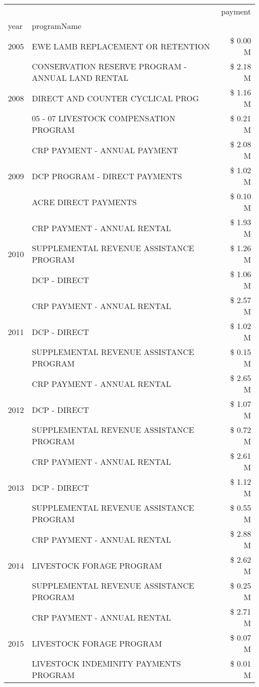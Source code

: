 \begin{tabular}{llr}
\toprule
 &  & payment \\
year & programName &  \\
\midrule
2005 & EWE LAMB REPLACEMENT OR RETENTION & \$ 0.00 M \\
\cline{1-3}
\multirow[t]{3}{*}{2008} & CONSERVATION RESERVE PROGRAM - ANNUAL LAND RENTAL & \$ 2.18 M \\
 & DIRECT AND COUNTER CYCLICAL PROG & \$ 1.16 M \\
 & 05 - 07 LIVESTOCK COMPENSATION PROGRAM & \$ 0.21 M \\
\cline{1-3}
\multirow[t]{3}{*}{2009} & CRP PAYMENT - ANNUAL PAYMENT & \$ 2.08 M \\
 & DCP PROGRAM - DIRECT PAYMENTS & \$ 1.02 M \\
 & ACRE DIRECT PAYMENTS & \$ 0.10 M \\
\cline{1-3}
\multirow[t]{3}{*}{2010} & CRP PAYMENT - ANNUAL RENTAL & \$ 1.93 M \\
 & SUPPLEMENTAL REVENUE ASSISTANCE PROGRAM & \$ 1.26 M \\
 & DCP - DIRECT & \$ 1.06 M \\
\cline{1-3}
\multirow[t]{3}{*}{2011} & CRP PAYMENT - ANNUAL RENTAL & \$ 2.57 M \\
 & DCP - DIRECT & \$ 1.02 M \\
 & SUPPLEMENTAL REVENUE ASSISTANCE PROGRAM & \$ 0.15 M \\
\cline{1-3}
\multirow[t]{3}{*}{2012} & CRP PAYMENT - ANNUAL RENTAL & \$ 2.65 M \\
 & DCP - DIRECT & \$ 1.07 M \\
 & SUPPLEMENTAL REVENUE ASSISTANCE PROGRAM & \$ 0.72 M \\
\cline{1-3}
\multirow[t]{3}{*}{2013} & CRP PAYMENT - ANNUAL RENTAL & \$ 2.61 M \\
 & DCP - DIRECT & \$ 1.12 M \\
 & SUPPLEMENTAL REVENUE ASSISTANCE PROGRAM & \$ 0.55 M \\
\cline{1-3}
\multirow[t]{3}{*}{2014} & CRP PAYMENT - ANNUAL RENTAL & \$ 2.88 M \\
 & LIVESTOCK FORAGE PROGRAM & \$ 2.62 M \\
 & SUPPLEMENTAL REVENUE ASSISTANCE PROGRAM & \$ 0.25 M \\
\cline{1-3}
\multirow[t]{3}{*}{2015} & CRP PAYMENT - ANNUAL RENTAL & \$ 2.71 M \\
 & LIVESTOCK FORAGE PROGRAM & \$ 0.07 M \\
 & LIVESTOCK INDEMINITY PAYMENTS PROGRAM & \$ 0.01 M \\

\end{tabular}

